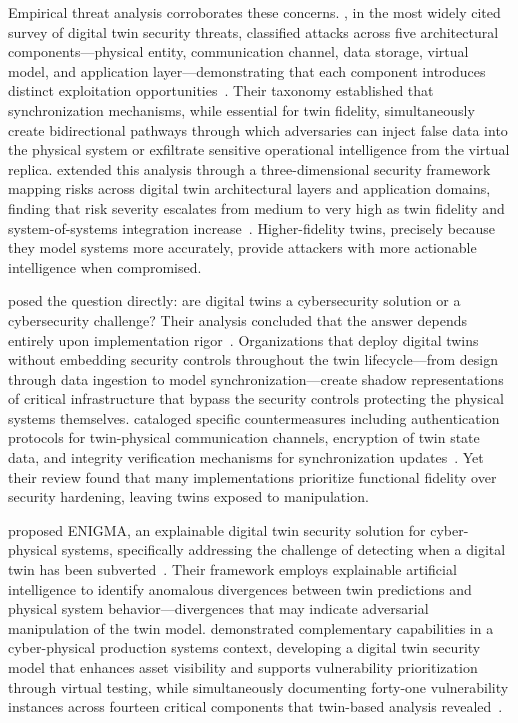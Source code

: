 Empirical threat analysis corroborates these concerns. \citeauthor{Alcaraz_Lopez_2022}, in the most widely cited survey of digital twin security threats, classified attacks across five architectural components---physical entity, communication channel, data storage, virtual model, and application layer---demonstrating that each component introduces distinct exploitation opportunities~\parencite{Alcaraz_Lopez_2022}. Their taxonomy established that synchronization mechanisms, while essential for twin fidelity, simultaneously create bidirectional pathways through which adversaries can inject false data into the physical system or exfiltrate sensitive operational intelligence from the virtual replica. \citeauthor{Jeremiah_2024} extended this analysis through a three-dimensional security framework mapping risks across digital twin architectural layers and application domains, finding that risk severity escalates from medium to very high as twin fidelity and system-of-systems integration increase~\parencite{Jeremiah_2024}. Higher-fidelity twins, precisely because they model systems more accurately, provide attackers with more actionable intelligence when compromised.

\citeauthor{Holmes_2021} posed the question directly: are digital twins a cybersecurity solution or a cybersecurity challenge? Their analysis concluded that the answer depends entirely upon implementation rigor~\parencite{Holmes_2021}. Organizations that deploy digital twins without embedding security controls throughout the twin lifecycle---from design through data ingestion to model synchronization---create shadow representations of critical infrastructure that bypass the security controls protecting the physical systems themselves. \citeauthor{Karaarslan_Babiker_2021} cataloged specific countermeasures including authentication protocols for twin-physical communication channels, encryption of twin state data, and integrity verification mechanisms for synchronization updates~\parencite{Karaarslan_Babiker_2021}. Yet their review found that many implementations prioritize functional fidelity over security hardening, leaving twins exposed to manipulation.

\citeauthor{Suhail_ENIGMA_2023} proposed ENIGMA, an explainable digital twin security solution for cyber-physical systems, specifically addressing the challenge of detecting when a digital twin has been subverted~\parencite{Suhail_ENIGMA_2023}. Their framework employs explainable artificial intelligence to identify anomalous divergences between twin predictions and physical system behavior---divergences that may indicate adversarial manipulation of the twin model. \citeauthor{Jiang_2024_CPPS} demonstrated complementary capabilities in a cyber-physical production systems context, developing a digital twin security model that enhances asset visibility and supports vulnerability prioritization through virtual testing, while simultaneously documenting forty-one vulnerability instances across fourteen critical components that twin-based analysis revealed~\parencite{Jiang_2024_CPPS}.

